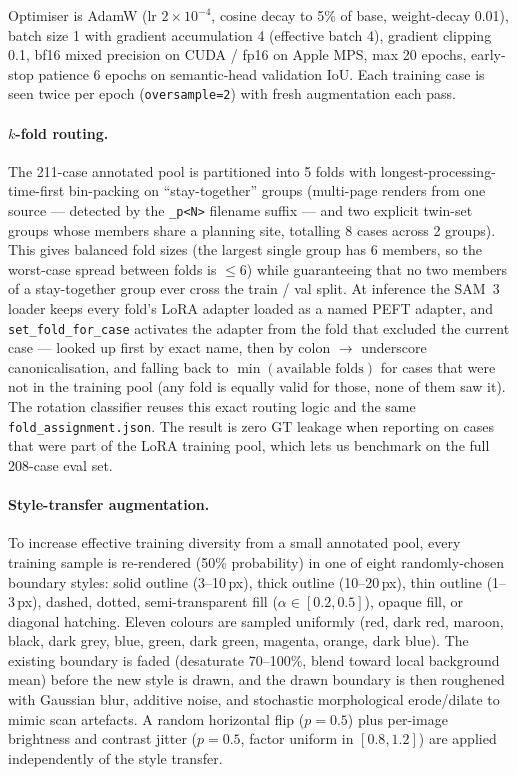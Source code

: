\documentclass[11pt]{article}
\begin{document}
Optimiser is AdamW (lr $2 \times 10^{-4}$, cosine decay to 5\% of base, weight-decay 0.01), batch size 1 with gradient accumulation 4 (effective batch 4), gradient clipping 0.1, bf16 mixed precision on CUDA / fp16 on Apple MPS, max 20 epochs, early-stop patience 6 epochs on semantic-head validation IoU. Each training case is seen twice per epoch (\texttt{oversample=2}) with fresh augmentation each pass.

\paragraph{$k$-fold routing.}
The 211-case annotated pool is partitioned into 5 folds with longest-processing-time-first bin-packing on ``stay-together'' groups (multi-page renders from one source --- detected by the \texttt{\_p<N>} filename suffix --- and two explicit twin-set groups whose members share a planning site, totalling 8 cases across 2 groups). This gives balanced fold sizes (the largest single group has 6 members, so the worst-case spread between folds is $\leq 6$) while guaranteeing that no two members of a stay-together group ever cross the train / val split. At inference the SAM~3 loader keeps every fold's LoRA adapter loaded as a named PEFT adapter, and \texttt{set\_fold\_for\_case} activates the adapter from the fold that excluded the current case --- looked up first by exact name, then by colon $\to$ underscore canonicalisation, and falling back to $\min(\text{available folds})$ for cases that were not in the training pool (any fold is equally valid for those, none of them saw it). The rotation classifier reuses this exact routing logic and the same \texttt{fold\_assignment.json}. The result is zero GT leakage when reporting on cases that were part of the LoRA training pool, which lets us benchmark on the full 208-case eval set.

\paragraph{Style-transfer augmentation.}
To increase effective training diversity from a small annotated pool, every training sample is re-rendered (50\% probability) in one of eight randomly-chosen boundary styles: solid outline (3--10\,px), thick outline (10--20\,px), thin outline (1--3\,px), dashed, dotted, semi-transparent fill ($\alpha \in [0.2, 0.5]$), opaque fill, or diagonal hatching. Eleven colours are sampled uniformly (red, dark red, maroon, black, dark grey, blue, green, dark green, magenta, orange, dark blue). The existing boundary is faded (desaturate 70--100\%, blend toward local background mean) before the new style is drawn, and the drawn boundary is then roughened with Gaussian blur, additive noise, and stochastic morphological erode/dilate to mimic scan artefacts. A random horizontal flip ($p{=}0.5$) plus per-image brightness and contrast jitter ($p{=}0.5$, factor uniform in $[0.8, 1.2]$) are applied independently of the style transfer.
\end{document}

